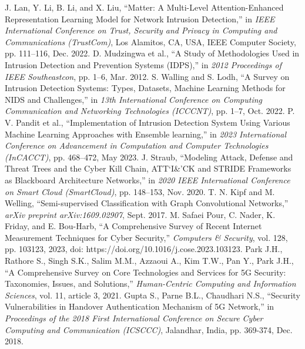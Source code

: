\documentclass[conference]{IEEEtran}
\begin{document}










\begin{thebibliography}{00}
     J. Lan, Y. Li, B. Li, and X. Liu, ``Matter: A Multi-Level Attention-Enhanced Representation Learning Model for Network Intrusion Detection,'' in \textit{IEEE International Conference on Trust, Security and Privacy in Computing and Communications (TrustCom)}, Los Alamitos, CA, USA, IEEE Computer Society, pp. 111--116, Dec. 2022.
     D. Mudzingwa et al., ``A Study of Methodologies Used in Intrusion Detection and Prevention Systems (IDPS),'' in \textit{2012 Proceedings of IEEE Southeastcon}, pp. 1--6, Mar. 2012.
     S. Walling and S. Lodh, ``A Survey on Intrusion Detection Systems: Types, Datasets, Machine Learning Methods for NIDS and Challenges,'' in \textit{13th International Conference on Computing Communication and Networking Technologies (ICCCNT)}, pp. 1--7, Oct. 2022.
     P. V. Pandit et al., ``Implementation of Intrusion Detection System Using Various Machine Learning Approaches with Ensemble learning,'' in \textit{2023 International Conference on Advancement in Computation and Computer Technologies (InCACCT)}, pp. 468--472, May 2023.
     J. Straub, ``Modeling Attack, Defense and Threat Trees and the Cyber Kill Chain, ATT‘I\&’CK and STRIDE Frameworks as Blackboard Architecture Networks,'' in \textit{2020 IEEE International Conference on Smart Cloud (SmartCloud)}, pp. 148--153, Nov. 2020.
     T. N. Kipf and M. Welling, ``Semi-supervised Classification with Graph Convolutional Networks,'' \textit{arXiv preprint arXiv:1609.02907}, Sept. 2017.
     M. Safaei Pour, C. Nader, K. Friday, and E. Bou-Harb, ``A Comprehensive Survey of Recent Internet Measurement Techniques for Cyber Security,'' \textit{Computers \& Security}, vol. 128, pp. 103123, 2023, doi: https://doi.org/10.1016/j.cose.2023.103123.
     Park J.H., Rathore S., Singh S.K., Salim M.M., Azzaoui A., Kim T.W., Pan Y., Park J.H., ``A Comprehensive Survey on Core Technologies and Services for 5G Security: Taxonomies, Issues, and Solutions,'' \textit{Human-Centric Computing and Information Sciences}, vol. 11, article 3, 2021.
     Gupta S., Parne B.L., Chaudhari N.S., ``Security Vulnerabilities in Handover Authentication Mechanism of 5G Network,'' in \textit{Proceedings of the 2018 First International Conference on Secure Cyber Computing and Communication (ICSCCC)}, Jalandhar, India, pp. 369-374, Dec. 2018.

\end{thebibliography}
\end{document}
